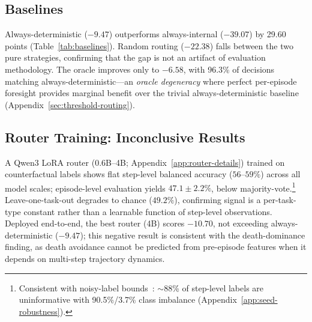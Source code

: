 \subsection{Baselines}
\label{sec:baselines}

Always-deterministic ($-9.47$) outperforms always-internal ($-39.07$) by 29.60 points (Table~\ref{tab:baselines}). Random routing ($-22.38$) falls between the two pure strategies, confirming that the gap is not an artifact of evaluation methodology. The oracle improves only to $-6.58$, with 96.3\% of decisions matching always-deterministic---an \emph{oracle degeneracy} where perfect per-episode foresight provides marginal benefit over the trivial always-deterministic baseline (Appendix~\ref{sec:threshold-routing}).

\subsection{Router Training: Inconclusive Results}
\label{sec:router-diagnostic}

A Qwen3 LoRA router (0.6B--4B; Appendix~\ref{app:router-details}) trained on counterfactual labels shows flat step-level balanced accuracy ($56$--$59\%$) across all model scales; episode-level evaluation yields $47.1 \pm 2.2\%$, below majority-vote.\footnote{Consistent with noisy-label bounds~\citep{natarajan2013learning}: ${\sim}$88\% of step-level labels are uninformative with 90.5\%/3.7\% class imbalance (Appendix~\ref{app:seed-robustness}).} Leave-one-task-out degrades to chance ($49.2\%$), confirming signal is a per-task-type constant rather than a learnable function of step-level observations. Deployed end-to-end, the best router (4B) scores $-10.70$, not exceeding always-deterministic ($-9.47$); this negative result is consistent with the death-dominance finding, as death avoidance cannot be predicted from pre-episode features when it depends on multi-step trajectory dynamics.

\begin{table}[t]
\centering
\small
{}
\caption{Episode-weighted mean scores on ScienceWorld (11 task types, 245 episodes). $\dagger$\,Single seed (42); see Appendix~\ref{app:seed-robustness} for 8-seed robustness.}
\label{tab:baselines}
\end{table}
